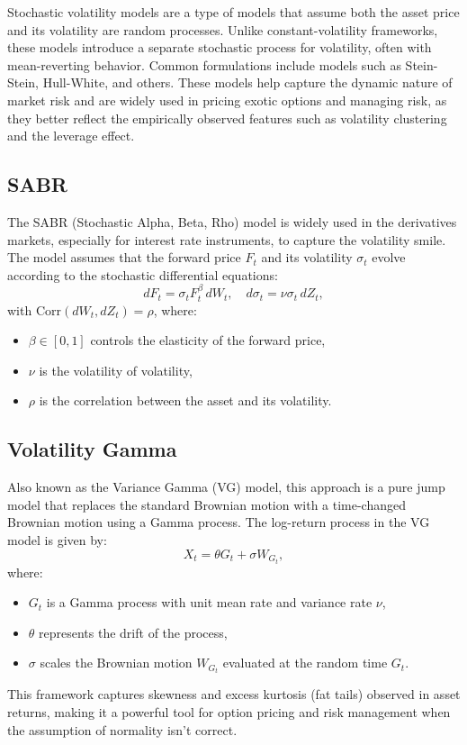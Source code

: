 \documentclass[letterpaper,11pt]{article}
\begin{document}
Stochastic volatility models are a type of models that assume both the asset price and its volatility are random processes. Unlike constant-volatility frameworks, these models introduce a separate stochastic process for volatility, often with mean-reverting behavior. Common formulations include models such as Stein-Stein, Hull-White, and others. These models help capture the dynamic nature of market risk and are widely used in pricing exotic options and managing risk, as they better reflect the empirically observed features such as volatility clustering and the leverage effect.\\



\subsection{SABR}
The SABR (Stochastic Alpha, Beta, Rho) model is widely used in the derivatives markets, especially for interest rate instruments, to capture the volatility smile. The model assumes that the forward price \(F_t\) and its volatility \(\sigma_t\) evolve according to the stochastic differential equations:
\[
dF_t = \sigma_t F_t^\beta\, dW_t, \quad
d\sigma_t = \nu \sigma_t\, dZ_t,
\]
with \(\mathrm{Corr}(dW_t,dZ_t)=\rho\), where:
\begin{itemize}
    \item \(\beta \in [0,1]\) controls the elasticity of the forward price,
    \item \(\nu\) is the volatility of volatility,
    \item \(\rho\) is the correlation between the asset and its volatility.
\end{itemize}



\subsection{Volatility Gamma}
Also known as the Variance Gamma (VG) model, this approach is a pure jump model that replaces the standard Brownian motion with a time-changed Brownian motion using a Gamma process. The log-return process in the VG model is given by:
\[
X_t = \theta G_t + \sigma W_{G_t},
\]
where:
\begin{itemize}
    \item \(G_t\) is a Gamma process with unit mean rate and variance rate \(\nu\),
    \item \(\theta\) represents the drift of the process,
    \item \(\sigma\) scales the Brownian motion \(W_{G_t}\) evaluated at the random time \(G_t\).
\end{itemize}
This framework captures skewness and excess kurtosis (fat tails) observed in asset returns, making it a powerful tool for option pricing and risk management when the assumption of normality isn't correct.
\end{document}
